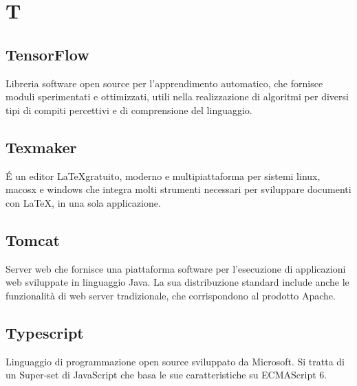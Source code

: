 \section*{T}
\markright{}
\subsection*{TensorFlow}
Libreria software open source per l'apprendimento automatico, che fornisce moduli sperimentati e ottimizzati, utili nella realizzazione di algoritmi per diversi tipi di compiti percettivi e di comprensione del linguaggio.
\subsection*{Texmaker}
\'E un editor \LaTeX gratuito, moderno e multipiattaforma per sistemi linux, macosx e windows che integra molti strumenti necessari per sviluppare documenti con \LaTeX, in una sola applicazione.
\subsection*{Tomcat}
Server web che fornisce una piattaforma software per l'esecuzione di applicazioni web sviluppate in linguaggio Java. La sua distribuzione standard include anche le funzionalità di web server tradizionale, che corrispondono al prodotto Apache. 
\subsection*{Typescript}
Linguaggio di programmazione open source sviluppato da Microsoft. Si tratta di un Super-set di JavaScript che basa le sue caratteristiche su ECMAScript 6.
